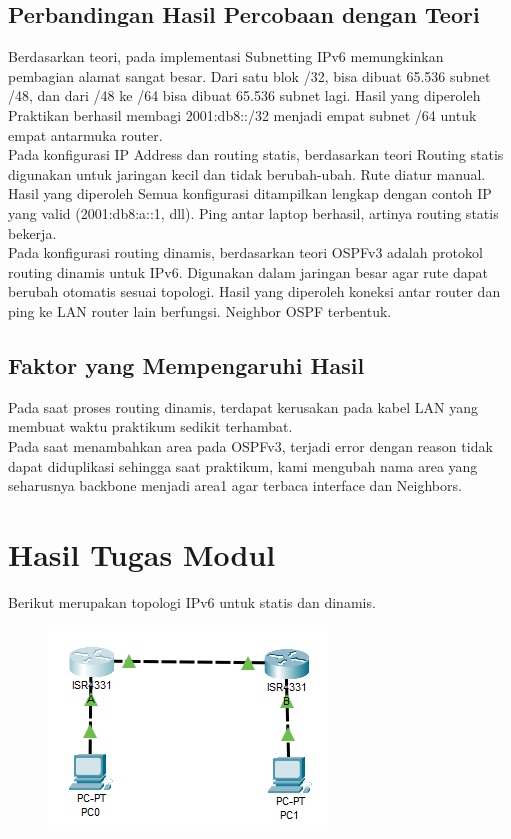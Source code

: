 \subsection{Perbandingan Hasil Percobaan dengan Teori}
Berdasarkan teori, pada implementasi Subnetting IPv6 memungkinkan pembagian alamat sangat besar. Dari satu blok /32, bisa dibuat 65.536 subnet /48, dan dari /48 ke /64 bisa dibuat 65.536 subnet lagi. Hasil yang diperoleh Praktikan berhasil membagi 2001:db8::/32 menjadi empat subnet /64 untuk empat antarmuka router. \\ 
Pada konfigurasi IP Address dan routing statis, berdasarkan teori Routing statis digunakan untuk jaringan kecil dan tidak berubah-ubah. Rute diatur manual. Hasil yang diperoleh Semua konfigurasi ditampilkan lengkap dengan contoh IP yang valid (2001:db8:a::1, dll). Ping antar laptop berhasil, artinya routing statis bekerja. \\
Pada konfigurasi routing dinamis, berdasarkan teori OSPFv3 adalah protokol routing dinamis untuk IPv6. Digunakan dalam jaringan besar agar rute dapat berubah otomatis sesuai topologi. Hasil yang diperoleh koneksi antar router dan ping ke LAN router lain berfungsi. Neighbor OSPF terbentuk.
\subsection{Faktor yang Mempengaruhi Hasil}
Pada saat proses routing dinamis, terdapat kerusakan pada kabel LAN yang membuat waktu praktikum sedikit terhambat. \\
Pada saat menambahkan area pada OSPFv3, terjadi error dengan reason tidak dapat diduplikasi sehingga saat praktikum, kami mengubah nama area yang seharusnya backbone menjadi area1 agar terbaca interface dan Neighbors.

\section{Hasil Tugas Modul}
Berikut merupakan topologi IPv6 untuk statis dan dinamis.
\begin{figure}[H]
    \centering
    \includegraphics[width=0.5\linewidth]{image/topologi.png}
    \label{fig:inirujukan}
\end{figure}
